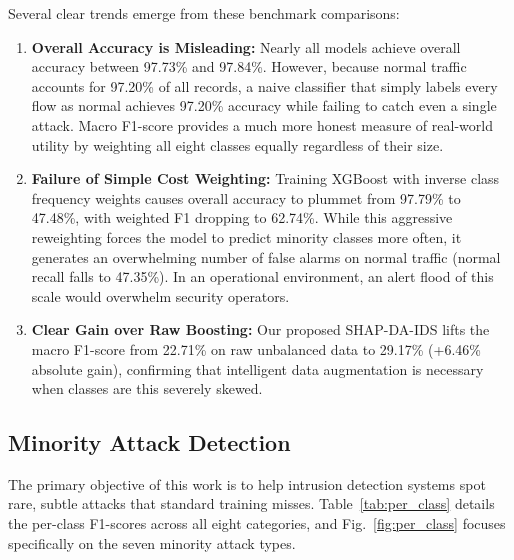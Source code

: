Several clear trends emerge from these benchmark comparisons:
\begin{enumerate}
    \item \textbf{Overall Accuracy is Misleading:} Nearly all models achieve overall accuracy between 97.73\% and 97.84\%. However, because normal traffic accounts for 97.20\% of all records, a naive classifier that simply labels every flow as normal achieves 97.20\% accuracy while failing to catch even a single attack. Macro F1-score provides a much more honest measure of real-world utility by weighting all eight classes equally regardless of their size.
    \item \textbf{Failure of Simple Cost Weighting:} Training XGBoost with inverse class frequency weights causes overall accuracy to plummet from 97.79\% to 47.48\%, with weighted F1 dropping to 62.74\%. While this aggressive reweighting forces the model to predict minority classes more often, it generates an overwhelming number of false alarms on normal traffic (normal recall falls to 47.35\%). In an operational environment, an alert flood of this scale would overwhelm security operators.
    \item \textbf{Clear Gain over Raw Boosting:} Our proposed SHAP-DA-IDS lifts the macro F1-score from 22.71\% on raw unbalanced data to 29.17\% (+6.46\% absolute gain), confirming that intelligent data augmentation is necessary when classes are this severely skewed.
\end{enumerate}

\subsection{Minority Attack Detection}
The primary objective of this work is to help intrusion detection systems spot rare, subtle attacks that standard training misses. Table~\ref{tab:per_class} details the per-class F1-scores across all eight categories, and Fig.~\ref{fig:per_class} focuses specifically on the seven minority attack types.

